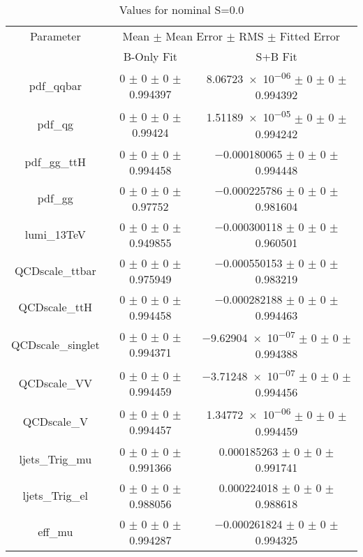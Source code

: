 \begin{table}
\centering
\caption{Values for nominal S=0.0}
\begin{tabular}{ccc}
\toprule
Parameter & \multicolumn{2}{c}{Mean $\pm$ Mean Error $\pm$ RMS $\pm$ Fitted Error}\\
 & B-Only Fit & S+B Fit\\
\midrule
pdf\_qqbar & \num{0} $\pm$ \num{0} $\pm$ \num{0} $\pm$ \num{0.994397} & \num{8.06723e-06} $\pm$ \num{0} $\pm$ \num{0} $\pm$ \num{0.994392}\\
pdf\_qg & \num{0} $\pm$ \num{0} $\pm$ \num{0} $\pm$ \num{0.99424} & \num{1.51189e-05} $\pm$ \num{0} $\pm$ \num{0} $\pm$ \num{0.994242}\\
pdf\_gg\_ttH & \num{0} $\pm$ \num{0} $\pm$ \num{0} $\pm$ \num{0.994458} & \num{-0.000180065} $\pm$ \num{0} $\pm$ \num{0} $\pm$ \num{0.994448}\\
pdf\_gg & \num{0} $\pm$ \num{0} $\pm$ \num{0} $\pm$ \num{0.97752} & \num{-0.000225786} $\pm$ \num{0} $\pm$ \num{0} $\pm$ \num{0.981604}\\
lumi\_13TeV & \num{0} $\pm$ \num{0} $\pm$ \num{0} $\pm$ \num{0.949855} & \num{-0.000300118} $\pm$ \num{0} $\pm$ \num{0} $\pm$ \num{0.960501}\\
QCDscale\_ttbar & \num{0} $\pm$ \num{0} $\pm$ \num{0} $\pm$ \num{0.975949} & \num{-0.000550153} $\pm$ \num{0} $\pm$ \num{0} $\pm$ \num{0.983219}\\
QCDscale\_ttH & \num{0} $\pm$ \num{0} $\pm$ \num{0} $\pm$ \num{0.994458} & \num{-0.000282188} $\pm$ \num{0} $\pm$ \num{0} $\pm$ \num{0.994463}\\
QCDscale\_singlet & \num{0} $\pm$ \num{0} $\pm$ \num{0} $\pm$ \num{0.994371} & \num{-9.62904e-07} $\pm$ \num{0} $\pm$ \num{0} $\pm$ \num{0.994388}\\
QCDscale\_VV & \num{0} $\pm$ \num{0} $\pm$ \num{0} $\pm$ \num{0.994459} & \num{-3.71248e-07} $\pm$ \num{0} $\pm$ \num{0} $\pm$ \num{0.994456}\\
QCDscale\_V & \num{0} $\pm$ \num{0} $\pm$ \num{0} $\pm$ \num{0.994457} & \num{1.34772e-06} $\pm$ \num{0} $\pm$ \num{0} $\pm$ \num{0.994459}\\
ljets\_Trig\_mu & \num{0} $\pm$ \num{0} $\pm$ \num{0} $\pm$ \num{0.991366} & \num{0.000185263} $\pm$ \num{0} $\pm$ \num{0} $\pm$ \num{0.991741}\\
ljets\_Trig\_el & \num{0} $\pm$ \num{0} $\pm$ \num{0} $\pm$ \num{0.988056} & \num{0.000224018} $\pm$ \num{0} $\pm$ \num{0} $\pm$ \num{0.988618}\\
eff\_mu & \num{0} $\pm$ \num{0} $\pm$ \num{0} $\pm$ \num{0.994287} & \num{-0.000261824} $\pm$ \num{0} $\pm$ \num{0} $\pm$ \num{0.994325}\\

\end{tabular}
\end{table}
